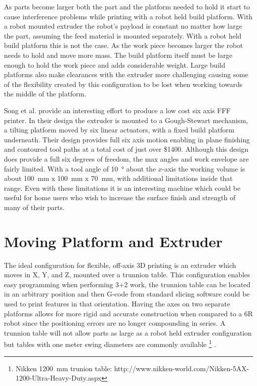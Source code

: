 \documentclass[main.tex]{subfiles}
\begin{document}
As parts become larger both the part and the platform needed to hold it start to cause interference problems while printing with a robot held build platform.
With a robot mounted extruder the robot's payload is constant no matter how large the part, assuming the feed material is mounted separately.
With a robot held build platform this is not the case. 
As the work piece becomes larger the robot needs to hold and move more mass.
The build platform itself must be large enough to hold the work piece and adds considerable weight.
Large build platforms also make clearances with the extruder more challenging causing some of the flexibility created by this configuration to be lost when working towards the middle of the platform.

Song et al. \cite{Song2015} provide an interesting effort to produce a low cost six axis FFF printer.
In their design the extruder is mounted to a Gough-Stewart mechanism, a tilting platform moved by six linear actuators, with a fixed build platform underneath.
Their design provides full six axis motion enabling in plane finishing and contoured tool paths at a total cost of just over \$1400.
Although this design does provide a full six degrees of freedom, the max angles and work envelope are fairly limited.
With a tool angle of \SI{10}{\degree} about the $x$\nobreakdash-axis the working volume is about \SI{100}{\mm} x \SI{100}{\mm} x \SI{70}{\mm}, with additional limitations inside that range.
Even with these limitations it is an interesting machine which could be useful for home users who wish to increase the surface finish and strength of many of their parts.

\section{Moving Platform and Extruder}
The ideal configuration for flexible, off-axis 3D printing is an extruder which moves in X, Y, and Z, mounted over a trunnion table.
This configuration enables easy programming when performing 3+2 work, the trunnion table can be located in an arbitrary position and then G-code from standard slicing software could be used to print features in that orientation.
Having the axes on two separate platforms allows for more rigid and accurate construction when compared to a 6R robot since the positioning errors are no longer compounding in series.
A trunnion table will not allow parts as large as a robot held extruder configuration but tables with one meter swing diameters are commonly available%
\footnote{Nikken \SI{1200}{mm} trunion table: http://www.nikken-world.com/Nikken-5AX-1200-Ultra-Heavy-Duty.aspx}%
.
\end{document}
